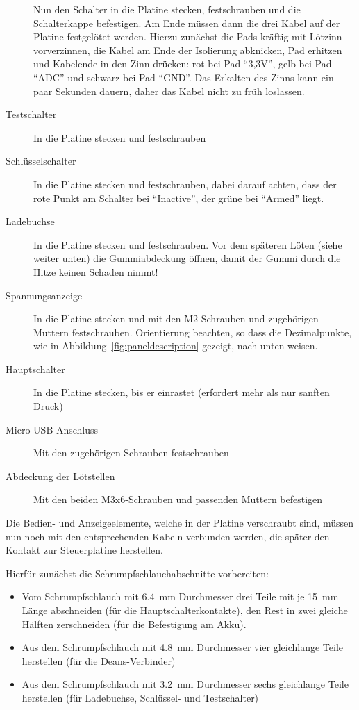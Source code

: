 \documentclass[paper=a4, open=any, numbers=noenddot]{scrbook}
\begin{document}
\begin{description}
					      Nun den Schalter in die Platine stecken, festschrauben und die Schalterkappe befestigen. Am Ende müssen dann die drei Kabel auf der Platine festgelötet werden. Hierzu zunächst die Pads kräftig mit Lötzinn vorverzinnen, die Kabel am Ende der Isolierung abknicken, Pad erhitzen und Kabelende in den Zinn drücken: rot bei Pad \enquote{3,3V}, gelb bei Pad \enquote{ADC} und schwarz bei Pad \enquote{GND}. Das Erkalten des Zinns kann ein paar Sekunden dauern, daher das Kabel nicht zu früh loslassen.
					\item
					      [Testschalter] In die Platine stecken und festschrauben
					\item
					      [Schlüsselschalter] In die Platine stecken und festschrauben, dabei darauf achten, dass der rote Punkt am Schalter bei \enquote{Inactive}, der grüne bei \enquote{Armed} liegt.
					\item
					      [Ladebuchse] In die Platine stecken und festschrauben. Vor dem späteren Löten (siehe weiter unten) die Gummiabdeckung öffnen, damit der Gummi durch die Hitze keinen Schaden nimmt!
					\item
					      [Spannungsanzeige] In die Platine stecken und mit den M2-Schrauben und zugehörigen Muttern festschrauben. Orientierung beachten, so dass die Dezimalpunkte, wie in Abbildung~\ref{fig:paneldescription} gezeigt, nach unten weisen.
					\item
					      [Hauptschalter] In die Platine stecken, bis er einrastet (erfordert mehr als nur sanften Druck)
					\item
					      [Micro-USB-Anschluss] Mit den zugehörigen Schrauben festschrauben
					\item
					      [Abdeckung der Lötstellen] Mit den beiden M3x6-Schrauben und passenden Muttern befestigen
				\end{description}

				Die Bedien- und Anzeigeelemente, welche in der Platine verschraubt sind, müssen nun noch mit den entsprechenden Kabeln verbunden werden, die später den Kontakt zur Steuerplatine herstellen.

				Hierfür zunächst die Schrumpfschlauchabschnitte vorbereiten:
				\begin{itemize}
					\item
					      Vom Schrumpfschlauch mit \SI{6,4}{\milli\metre} Durchmesser drei Teile mit je \SI{15}{\milli\metre} Länge abschneiden (für die Hauptschalterkontakte), den Rest in zwei gleiche Hälften zerschneiden (für die Befestigung am Akku).
					\item
					      Aus dem Schrumpfschlauch mit \SI{4,8}{\milli\metre} Durchmesser vier gleichlange Teile herstellen (für die Deans-Verbinder)
					\item
					      Aus dem Schrumpfschlauch mit \SI{3,2}{\milli\metre} Durchmesser sechs gleichlange Teile herstellen (für Ladebuchse, Schlüssel- und Testschalter)
				\end{itemize}
\end{document}
